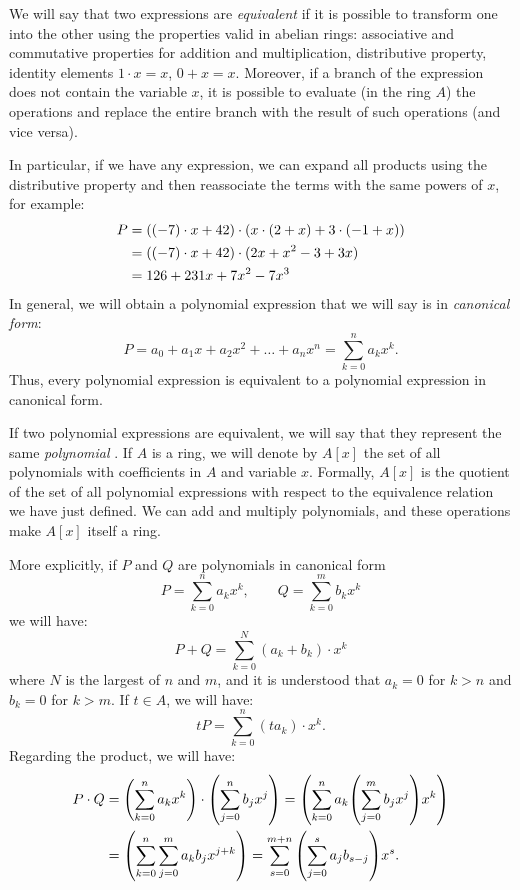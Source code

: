 We will say that two expressions are \emph{equivalent} if it is possible to
transform one into the other using the properties valid in abelian rings:
associative and commutative properties for addition and multiplication,
distributive property, identity elements $1\cdot x = x$, $0 + x = x$. Moreover,
if a branch of the expression does not contain the variable $x$, it is possible
to evaluate (in the ring $A$) the operations and replace the entire branch with
the result of such operations (and vice versa).

In particular, if we have any expression, we can expand all products using the
distributive property and then reassociate the terms with the same powers of
$x$, for example:
\begin{align*}
P &= {\left( (-7)\cdot x+42 \right)}\cdot(x\cdot (2 + x)
+ 3\cdot(-1+x))\\
&= {\left( (-7)\cdot x + 42 \right)}\cdot (2x+x^2-3+3x) \\
&= 126 + 231 x + 7 x^2 - 7 x^3
\end{align*}
In general, we will obtain a polynomial expression that we will say is in
\emph{canonical form}:
\[
  P = a_0 + a_1 x + a_2 x^2 + \dots + a_n x^n
       = \sum_{k=0}^n a_k x^k.
\]
Thus, every polynomial expression is equivalent to a polynomial expression in
canonical form.

If two polynomial expressions are equivalent, we will say that they represent
the same \emph{polynomial}%
%
.
If $A$ is a ring, we will denote by 
$A[x]$ \index{$\KK[x]$}%
the set of all polynomials with coefficients in $A$ and variable $x$. 
Formally, $A[x]$ is the quotient of the set 
of all polynomial expressions with respect to the equivalence relation
we have just defined. 
We can add and multiply polynomials, and these operations 
make $A[x]$ itself a ring.

More explicitly, if $P$ and $Q$ are polynomials in canonical form
\[
  P = \sum_{k=0}^n a_k x^k, \qquad Q = \sum_{k=0}^m b_k x^k
\]
we will have:
\[
  P + Q = \sum_{k=0}^{N} (a_k+b_k) \cdot x^k
\]
where $N$ is the largest of $n$ and $m$, and it is understood that $a_k=0$ for
$k>n$ and
$b_k=0$ for $k>m$.
If $t\in A$, we will have:
\[
  t P = \sum_{k=0}^n (ta_k)\cdot x^k.
\]
Regarding the product, we will have:
\begin{align*}
  P\cdot Q
  &= {\left( \sum_{k=0}^n a_k x^k \right)}\cdot {\left( \sum_{j=0}^n b_j x^j \right)}
  = {\left( \sum_{k=0}^n a_k {\left( \sum_{j=0}^m b_j x^j \right)} x^k \right)} \\
  &= {\left( \sum_{k=0}^n \sum_{j=0}^m a_k b_j x^{j+k} \right)}
  = \sum_{s=0}^{m+n} {\left( \sum_{j=0}^s a_j b_{s-j} \right)} x^s.
\end{align*}

